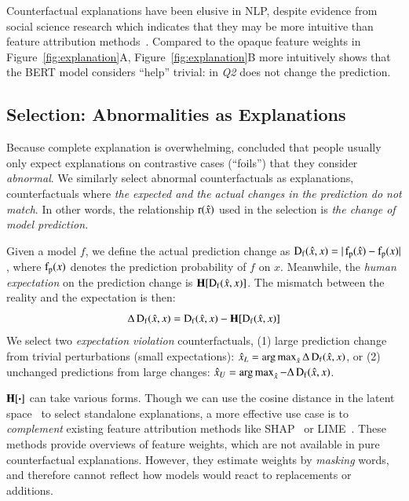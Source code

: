Counterfactual explanations have been elusive in NLP, despite evidence from social science research which indicates that they may be more intuitive than feature attribution methods~\cite{miller}.
Compared to the opaque feature weights in Figure~\ref{fig:explanation}A, Figure~\ref{fig:explanation}B more intuitively shows that the BERT \qqp model considers ``help'' trivial: 
 in \emph{Q2} does not change the prediction.

\subsection{Selection: Abnormalities as Explanations}
\label{subsec:local_explain}


Because complete explanation is overwhelming, \citet{miller} concluded that people usually only expect explanations on contrastive cases (``foils'') that they consider \emph{abnormal}.
We similarly select abnormal counterfactuals as explanations, \ie counterfactuals where \emph{the expected and the actual changes in the prediction do not match}.
In other words, the relationship $\operatorname*{r}(\hat{x})$ used in the selection is \emph{the change of model prediction.}

Given a model $f$, we define the actual prediction change as $\operatorname*{D_f}(\hat{x}, x)=|\operatorname*{f_p}(\hat{x})-\operatorname*{f_p}(x)|$, where $\operatorname*{f_p}(x)$ denotes the prediction probability of $f$ on $x$.
Meanwhile, the \emph{human expectation} on the prediction change is $\operatorname*{\mathbf{H}}[\operatorname*{D_f}(\hat{x}, x)]$.
The mismatch between the reality and the expectation is then:
$$\Delta\operatorname*{D_f}(\hat{x}, x) = \operatorname*{D_f}(\hat{x}, x)-\operatorname*{\mathbf{H}}[\operatorname*{D_f}(\hat{x}, x)]$$
We select two \emph{expectation violation} counterfactuals, \ie (1) large prediction change from trivial perturbations (small expectations): $\hat{x}_L = \operatorname*{arg\,max}_{\hat{x}} \Delta\operatorname*{D_f}(\hat{x}, x)$, or (2) unchanged predictions from large changes: $\hat{x}_U = \operatorname*{arg\,max}_{\hat{x}} -\Delta\operatorname*{D_f}(\hat{x}, x)$. 

$\operatorname*{\mathbf{H}}[\boldsymbol{\cdot}]$ can take various forms.
Though we can use the cosine distance in the latent space~\cite{reimers-2019-sentence-bert} to select standalone explanations, a more effective use case is to \emph{complement} existing feature attribution methods like SHAP~\cite{NIPS2017_7062} or LIME~\cite{Ribeiro2016WhySI}.
These methods provide overviews of feature weights, which are not available in pure counterfactual explanations.
However, they estimate weights by \emph{masking} words, and therefore cannot reflect how models would react to replacements or additions.

